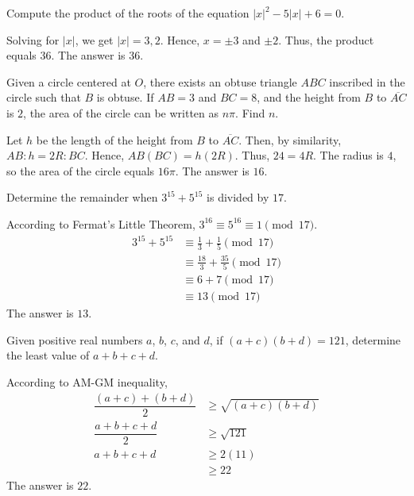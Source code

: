 \begin{problem}
Compute the product of the roots of the equation $|x|^2-5|x|+6=0$.
\end{problem}

\begin{solution}
Solving for $|x|$, we get $|x|=3,2$. Hence, $x=\pm3$ and $\pm2$. Thus, the product equals $36$. The answer is $36$.
\end{solution}

\begin{problem}
Given a circle centered at $O$, there exists an obtuse triangle $ABC$ inscribed in the circle such that $B$ is obtuse. If $AB=3$ and $BC=8$, and the height from $B$ to $\overline{AC}$ is $2$, the area of the circle can be written as $n\pi$. Find $n$.
\end{problem}

\begin{solution}
Let $h$ be the length of the height from $B$ to $\overline{AC}$. Then, by similarity, $AB:h=2R:BC$. Hence, $AB(BC)=h(2R)$. Thus, $24=4R$. The radius is $4$, so the area of the circle equals $16\pi$. The answer is $16$.
\end{solution}

\begin{problem}
Determine the remainder when $3^{15}+5^{15}$ is divided by $17$. 
\end{problem}

\begin{solution}
According to Fermat's Little Theorem, $3^{16}\equiv 5^{16} \equiv 1 \pmod{17}$.
\begin{align*}
    3^{15}+5^{15} & \equiv \frac13+\frac15 \pmod{17}\\
    & \equiv \frac{18}{3}+\frac{35}{5} \pmod{17}\\
    & \equiv 6+7 \pmod{17}\\
    & \equiv 13 \pmod{17}
\end{align*}
The answer is $13$.
\end{solution}

\begin{problem}
Given positive real numbers $a$, $b$, $c$, and $d$, if $(a+c)(b+d)=121$, determine the least value of $a+b+c+d$.
\end{problem}

\begin{solution}
According to AM-GM inequality, 
\begin{align*}
    \dfrac{(a+c)+(b+d)}{2} & \geq \sqrt{(a+c)(b+d)}\\
    \dfrac{a+b+c+d}{2} & \geq \sqrt{121}\\
    a+b+c+d &\geq 2(11)\\
    &\geq 22
\end{align*}
The answer is $22$.
\end{solution}

